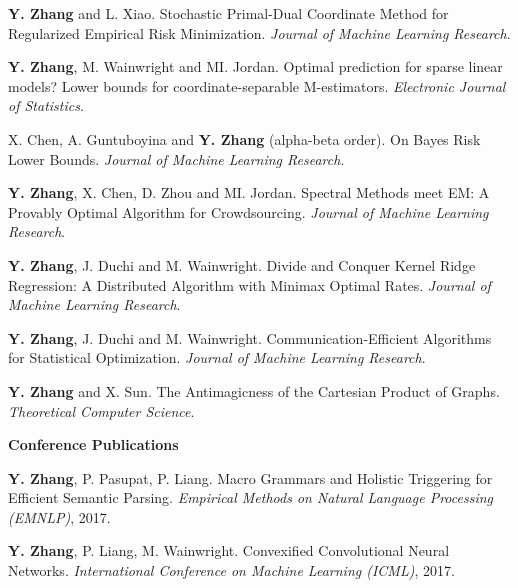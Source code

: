 \documentclass{res} %
\begin{document}
\begin{resume}
\begin{enumerate}[label={[J\arabic*]}, ref={J\arabic*}]
\item \textbf{Y. Zhang} and L. Xiao. Stochastic Primal-Dual Coordinate Method for Regularized Empirical Risk Minimization.
\emph{Journal of Machine Learning Research}.\label{stochastic-jmlr}

\item \textbf{Y. Zhang}, M. Wainwright and MI. Jordan. Optimal prediction for sparse linear models? Lower bounds for coordinate-separable M-estimators.\label{optimality-ejs}
\emph{Electronic Journal of Statistics}.

\item X. Chen, A. Guntuboyina and \textbf{Y. Zhang} (alpha-beta order). On Bayes Risk Lower Bounds.
\emph{Journal of Machine Learning Research}.\label{on-bayes-jmlr}

\item \textbf{Y. Zhang}, X. Chen, D. Zhou and MI. Jordan. Spectral Methods meet EM: A Provably Optimal Algorithm for Crowdsourcing.
\emph{Journal of Machine Learning Research}.\label{spectral-jmlr}

\item \textbf{Y. Zhang}, J. Duchi and M. Wainwright. Divide and Conquer Kernel Ridge Regression: A Distributed Algorithm with Minimax Optimal Rates.
\emph{Journal of Machine Learning Research}.\label{divide-jmlr}

\item \textbf{Y. Zhang}, J. Duchi and M. Wainwright. Communication-Efficient Algorithms for Statistical Optimization.
\emph{Journal of Machine Learning Research}.\label{communication-jmlr}

\item \textbf{Y. Zhang} and X. Sun. The Antimagicness of the Cartesian Product of Graphs.
\emph{Theoretical Computer Science}.\label{the-antimagicness-tcs}
\end{enumerate}

{\bf\Large Conference Publications}
\vspace{5pt}

\begin{enumerate}[label={[C\arabic*]}, ref={C\arabic*}]

\item  \textbf{Y. Zhang}, P. Pasupat, P. Liang. Macro Grammars and Holistic Triggering for Efficient Semantic Parsing.
\emph{Empirical Methods on Natural Language Processing (EMNLP)}, 2017. \label{macro-emnlp17}

\item  \textbf{Y. Zhang}, P. Liang, M. Wainwright. Convexified Convolutional Neural Networks.
\emph{International Conference on Machine Learning (ICML)}, 2017. \label{convexified-icml17}


\end{enumerate}
\end{resume}
\end{document}
